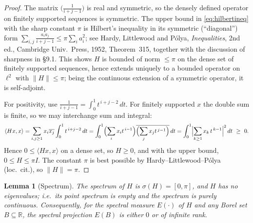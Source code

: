 \documentclass[12pt]{article}
\newtheorem{lemma}{Lemma}
\theoremstyle{remark}
\newcommand{\spec}{\sigma}
\begin{document}
\begin{proof}
The matrix $\bigl(\tfrac1{i+j-1}\bigr)$ is real and symmetric, so the densely defined operator
on finitely supported sequences is symmetric. The upper bound in \eqref{eq:hilbertineq} with the
sharp constant $\pi$ is Hilbert's inequality in its symmetric (``diagonal'') form
$\sum_{i,j}\frac{a_i a_j}{i+j-1}\le\pi\sum_i a_i^2$; see Hardy, Littlewood and P\'olya,
\emph{Inequalities}, 2nd ed., Cambridge Univ.\ Press, 1952, Theorem~315, together with the
discussion of sharpness in \S9.1. This shows $H$ is bounded of norm $\le\pi$ on the dense set of
finitely supported sequences, hence extends uniquely to a bounded operator on $\ell^2$ with
$\|H\|\le\pi$; being the continuous extension of a symmetric operator, it is self-adjoint.

For positivity, use $\frac1{i+j-1}=\int_0^1 t^{\,i+j-2}\,dt$. For finitely supported $x$ the
double sum is finite, so we may interchange sum and integral:
\[
\langle Hx,x\rangle=\sum_{i,j\ge1}x_i\overline{x_j}\int_0^1 t^{\,i+j-2}\,dt
=\int_0^1\Bigl(\sum_{i}x_i t^{\,i-1}\Bigr)\overline{\Bigl(\sum_{j}x_j t^{\,j-1}\Bigr)}\,dt
=\int_0^1\Bigl|\sum_{k\ge1}x_k\,t^{\,k-1}\Bigr|^2\,dt\ \ge\ 0 .
\]
Hence $0\le\langle Hx,x\rangle$ on a dense set, so $H\ge0$, and with the upper bound,
$0\le H\le\pi I$. The constant $\pi$ is best possible by Hardy--Littlewood--P\'olya
(loc.\ cit.), so $\|H\|=\pi$.
\end{proof}

\begin{lemma}[Spectrum]\label{lem:spec}
The spectrum of $H$ is $\spec(H)=[0,\pi]$, and $H$ has \emph{no} eigenvalues; i.e.\ its point
spectrum is empty and the spectrum is purely continuous. Consequently, for the spectral measure
$E(\cdot)$ of $H$ and any Borel set $B\subseteq\mathbb{R}$, the spectral projection $E(B)$ is
either $0$ or of infinite rank.
\end{lemma}
\end{document}
